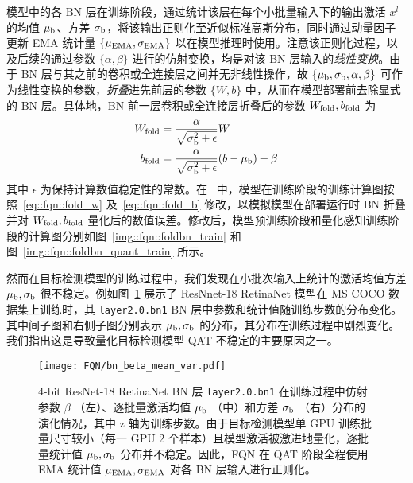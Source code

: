 模型中的各 BN 层在训练阶段，通过统计该层在每个小批量输入下的输出激活 $x^l$ 的均值 ${ \mu }_{\mathrm{b}}$、方差 ${ \sigma }_{\mathrm{b}}$，将该输出正则化至近似标准高斯分布，同时通过动量因子更新 EMA 统计量 $\{{ \mu }_{\mathrm{EMA}}, { \sigma }_{\mathrm{EMA}}\}$ 以在模型推理时使用。注意该正则化过程，以及后续的通过参数 $\{\alpha, \beta\}$ 进行的仿射变换，均是对该 BN 层输入的\emph{线性变换}。由于 BN 层与其之前的卷积或全连接层之间并无非线性操作，故 $\{{ \mu }_{\mathrm{b}}, { \sigma }_{\mathrm{b}}, \alpha, \beta\}$ 可作为线性变换的参数，\emph{折叠}进先前层的参数 $\{W, b\}$ 中，从而在模型部署前去除显式的 BN 层。具体地，BN 前一层卷积或全连接层折叠后的参数 ${ W }_{\mathrm{fold}}, { b }_{\mathrm{fold}}$ 为
\begin{align}
  { W }_{\mathrm{fold}} &= \frac{\alpha}{\sqrt{{ \sigma }_{\mathrm{b}}^2 + \epsilon}} W \label{eq::fqn::fold_w} \\
  { b }_{\mathrm{fold}} &= \frac{\alpha}{\sqrt{{ \sigma }_{\mathrm{b}}^2 + \epsilon}} (b - { \mu }_{\mathrm{b}}) + \beta \label{eq::fqn::fold_b}
\end{align}
其中 $\epsilon$ 为保持计算数值稳定性的常数。在~\citet{jacob2018quantization, krishnamoorthi2018quantizing} 中，模型在训练阶段的训练计算图按照~\eqref{eq::fqn::fold_w} 及~\eqref{eq::fqn::fold_b} 修改，以模拟模型在部署运行时 BN 折叠并对 ${ W }_{\mathrm{fold}}, { b }_{\mathrm{fold}}$ 量化后的数值误差。修改后，模型预训练阶段和量化感知训练阶段的计算图分别如图~\ref{img::fqn::foldbn_train} 和图~\ref{img::fqn::foldbn_quant_train} 所示。

然而在目标检测模型的训练过程中，我们发现在小批次输入上统计的激活均值方差 ${ \mu }_{\mathrm{b}}, { \sigma }_{\mathrm{b}}$ 很不稳定。例如图~\ref{img::fqn::bn_stat} 展示了 ResNnet-18 RetinaNet 模型在 MS COCO 数据集上训练时，其 \verb|layer2.0.bn1| BN 层中参数和统计值随训练步数的分布变化。其中间子图和右侧子图分别表示 ${ \mu }_{\mathrm{b}}, { \sigma }_{\mathrm{b}}$ 的分布，其分布在训练过程中剧烈变化。我们指出这是导致量化目标检测模型 QAT 不稳定的主要原因之一。

\begin{figure}[htb]
  \centering
  \texttt{[image: FQN/bn\_beta\_mean\_var.pdf]}
  \caption{4-bit ResNet-18 RetinaNet BN 层 \texttt{layer2.0.bn1} 在训练过程中仿射参数 $\beta$ （左）、逐批量激活均值 ${ \mu }_{\mathrm{b}}$ （中）和方差 ${ \sigma }_{\mathrm{b}}$ （右）分布的演化情况，其中 z 轴为训练步数。由于目标检测模型单 GPU 训练批量尺寸较小（每一 GPU 2 个样本）且模型激活被激进地量化，逐批量统计值 ${ \mu }_{\mathrm{b}}, { \sigma }_{\mathrm{b}}$ 分布并不稳定。因此，FQN 在 QAT 阶段全程使用 EMA 统计值 ${ \mu }_{\mathrm{EMA}}, { \sigma }_{\mathrm{EMA}}$ 对各 BN 层输入进行正则化。}
  \label{img::fqn::bn_stat}
\end{figure}

